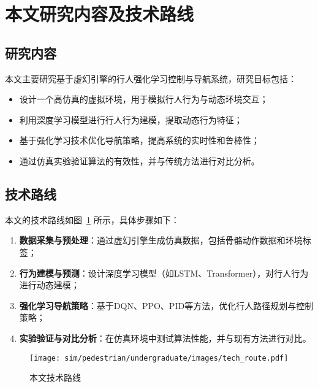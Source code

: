 \section*{本文研究内容及技术路线}

\subsection*{研究内容}

本文主要研究基于虚幻引擎的行人强化学习控制与导航系统，研究目标包括：
\begin{itemize}
    \item 设计一个高仿真的虚拟环境，用于模拟行人行为与动态环境交互；
    \item 利用深度学习模型进行行人行为建模，提取动态行为特征；
    \item 基于强化学习技术优化导航策略，提高系统的实时性和鲁棒性；
    \item 通过仿真实验验证算法的有效性，并与传统方法进行对比分析。
\end{itemize}

\subsection*{技术路线}

本文的技术路线如图~\ref{fig:tech_route} 所示，具体步骤如下：
\begin{enumerate}
    \item \textbf{数据采集与预处理}：通过虚幻引擎生成仿真数据，包括骨骼动作数据和环境标签；
    \item \textbf{行为建模与预测}：设计深度学习模型（如LSTM、Transformer），对行人行为进行动态建模；
    \item \textbf{强化学习导航策略}：基于DQN、PPO、PID等方法，优化行人路径规划与控制策略；
    \item \textbf{实验验证与对比分析}：在仿真环境中测试算法性能，并与现有方法进行对比。
\end{enumerate}

\begin{figure}[htbp]
    \centering
    \texttt{[image: sim/pedestrian/undergraduate/images/tech\_route.pdf]}
    \caption{本文技术路线}
    \label{fig:tech_route}
\end{figure}
